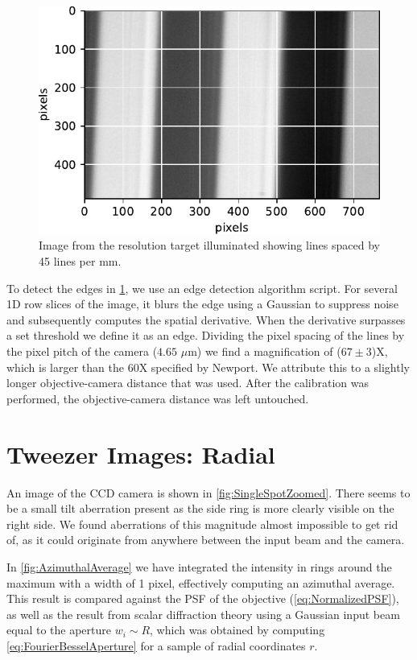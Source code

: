 \begin{figure}
    \centering
    \includegraphics[width = 0.42\linewidth]{figures/LineSpacingCalibration.pdf}
    \caption{Image from the resolution target illuminated showing lines spaced by 45 lines per mm.}
    \label{fig:resolutionTarget}
\end{figure}

To detect the edges in \cref{fig:resolutionTarget}, we use an edge detection algorithm script.
For several 1D row slices of the image, it blurs the edge using a Gaussian to suppress noise and subsequently computes the spatial derivative. 
When the derivative surpasses a set threshold we define it as an edge.
Dividing the pixel spacing of the lines by the pixel pitch of the camera ($4.65$ $\mu$m) we find a magnification of ($67 \pm 3$)X, which is larger than the 60X specified by Newport. 
We attribute this to a slightly longer objective-camera distance that was used. 
After the calibration was performed, the objective-camera distance was left untouched. 

\section{Tweezer Images: Radial}\label{sec:TweezerRadial}

An image of the CCD camera is shown in \cref{fig:SingleSpotZoomed}. 
There seems to be a small tilt aberration present as the side ring is more clearly visible on the right side. 
We found aberrations of this magnitude almost impossible to get rid of, as it could originate from anywhere between the input beam and the camera.

In \cref{fig:AzimuthalAverage} we have integrated the intensity in rings around the maximum with a width of 1 pixel, effectively computing an azimuthal average. 
This result is compared against the \ac{PSF} of the objective (\cref{eq:NormalizedPSF}), as well as the result from scalar diffraction theory using a Gaussian input beam equal to the aperture $w_i \sim R$, which was obtained by computing \cref{eq:FourierBesselAperture} for a sample of radial coordinates $r$. 

